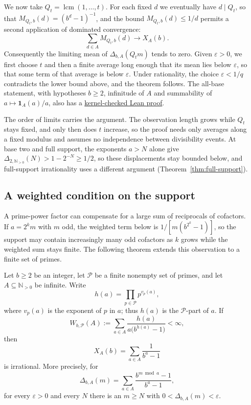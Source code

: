 We now take $Q_t=\operatorname{lcm}(1,\ldots,t)$. For each fixed $d$ we
eventually have $d\mid Q_t$, so that $M_{Q_t,b}(d)=(b^d-1)^{-1}$, and the
bound $M_{Q_t,b}(d)\le1/d$ permits a second application of dominated
convergence:
\[
 \sum_{d\in A}M_{Q_t,b}(d)\longrightarrow X_A(b).
\]
Consequently the limiting mean of $\Delta_{b,A}(Q_tm)$ tends to zero.
Given $\varepsilon>0$, we first choose $t$ and then a finite average
long enough that its mean lies below $\varepsilon$, so that some term of
that average is below $\varepsilon$. Under rationality, the choice
$\varepsilon<1/q$ contradicts the lower bound above, and the theorem
follows. The all-base statement, with hypotheses $b\ge2$, infinitude of
$A$ and summability of $a\mapsto\mathbf1_A(a)/a$, also has a
\href{https://github.com/wcook04/plectis-erdos/blob/c91562bd574a387cde904481e609c7b4cacebb14/lean/Erdos249257/AllBaseReciprocalSupportIrrationality.lean#L395}{kernel-checked Lean proof}.

The order of limits carries the argument. The observation length grows
while $Q_t$ stays fixed, and only then does $t$ increase, so the proof needs
only averages along a fixed modulus and assumes no independence between
divisibility events. At base two and full support, the exponents $a>N$
alone give $\Delta_{2,\mathbb N_{>0}}(N)>1-2^{-N}\ge1/2$, so these
displacements stay bounded below, and full-support irrationality uses a
different argument (Theorem~\ref{thm:full-support}).

\subsection{A weighted condition on the support}
A prime-power factor can compensate for a large sum of reciprocals of
cofactors. If $a=2^km$ with $m$ odd, the weighted term below is
$1/[m(b^{2^k}-1)]$, so the support may contain increasingly many odd
cofactors as $k$ grows while the weighted sum stays finite. The following
theorem extends this observation to a finite set of primes.


\begin{thm}
\label{thm:257-weighted}
Let $b\ge2$ be an integer, let $\mathcal P$ be a finite nonempty set of
primes, and let $A\subseteq\mathbb N_{>0}$ be infinite.  Write
\[
 h(a)=\prod_{p\in\mathcal P}p^{v_p(a)},
\]
where $v_p(a)$ is the exponent of $p$ in $a$; thus $h(a)$ is the
$\mathcal P$-part of $a$.  If
\begin{equation}\label{eq:257-weighted-mass}
 W_{b,\mathcal P}(A):=
 \sum_{a\in A}\frac{h(a)}{a\bigl(b^{h(a)}-1\bigr)}<\infty,
\end{equation}
then
\[
 X_A(b)=\sum_{a\in A}\frac1{b^a-1}
\]
is irrational.  More precisely, for
\[
 \Delta_{b,A}(m)=
 \sum_{a\in A}\frac{b^{m\bmod a}-1}{b^a-1},
\]
for every $\varepsilon>0$ and every $N$ there is an $m\ge N$ with
$0<\Delta_{b,A}(m)<\varepsilon$.
\end{thm}

